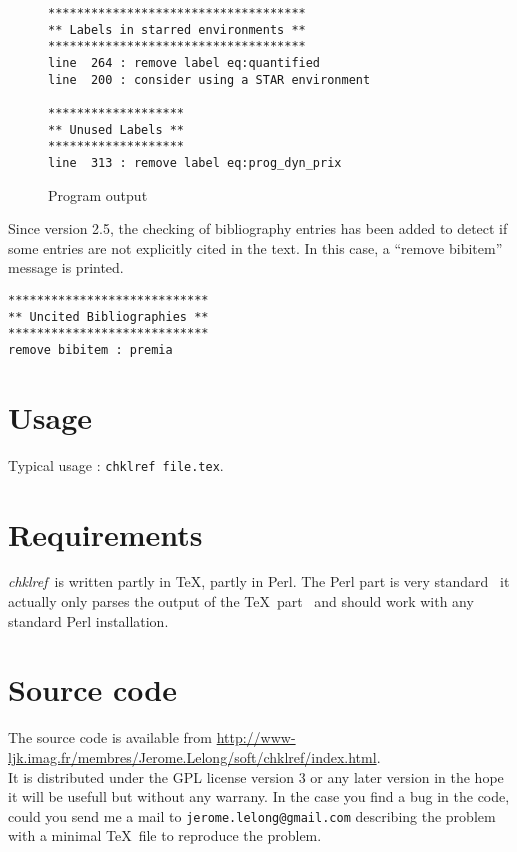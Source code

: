 \documentclass[a4paper,11pt,twoside]{article}
\def\chk{{\it chklref}}
\def\endpage{}%
\def\endpage{\HCode{</div>}}%
\begin{document}
\begin{figure}[htbp]
  \centering
\begin{verbatim}
************************************
** Labels in starred environments **
************************************
line  264 : remove label eq:quantified
line  200 : consider using a STAR environment

*******************
** Unused Labels **
*******************
line  313 : remove label eq:prog_dyn_prix
\end{verbatim}
  \caption{Program output}
  \label{fig:output}
\end{figure}

Since version 2.5, the checking of bibliography entries has been added to
detect if some entries are not explicitly cited in the text. In this case, a
``remove bibitem'' message is printed.
\begin{verbatim}
****************************
** Uncited Bibliographies **
****************************
remove bibitem : premia
\end{verbatim}


\section{Usage}

Typical usage : \verb!chklref file.tex!.
\\


\section{Requirements}

\chk\ is written partly in \TeX, partly in Perl. The Perl part is very
standard \textemdash\ it actually only parses the output of the \TeX\ part
\textemdash\ and should work with any standard Perl installation.


\section{Source code}

The source code is available from
\url{http://www-ljk.imag.fr/membres/Jerome.Lelong/soft/chklref/index.html}.
\\

\noindent It is distributed under the GPL license version 3 or any later
version in the hope it will be usefull but without any warrany. In the case
you find a bug in the code, could you send me a mail to
\verb!jerome.lelong@gmail.com! describing the problem with a minimal \TeX\
file to reproduce the problem.

\endpage
\end{document}
